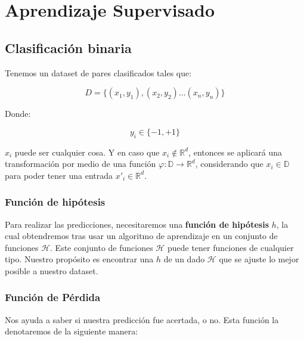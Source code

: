 \section{Aprendizaje Supervisado}

\subsection{Clasificación binaria}

Tenemos un dataset de pares clasificados tales que:

\[
    D = \{(x_1, y_1), (x_2, y_2) \dots (x_n, y_n)\}
\]

Donde:

\[
    y_i \in \{-1, +1\}
\]

$x_i$ puede ser cualquier cosa. 
Y en caso que $x_i \notin \mathbb{R} ^ d$, entonces se aplicará una transformación por medio de una función $\varphi : \mathbb{D} \to \mathbb{R} ^ d$, considerando que $x_i \in \mathbb{D}$ para poder tener una entrada $x'_i \in \mathbb{R}^d$.

\subsubsection{Función de hipótesis}

Para realizar las predicciones, necesitaremos una \textbf{función de hipótesis} $h$, la cual obtendremos tras usar un algoritmo de aprendizaje en un conjunto de funciones $\mathcal{H}$.
Este conjunto de funciones $\mathcal{H}$ puede tener funciones de cualquier tipo.
Nuestro propósito es encontrar una $h$ de un dado $\mathcal{H}$ que se ajuste lo mejor posible a nuestro dataset.


\subsubsection{Función de Pérdida}

Nos ayuda a saber si nuestra predicción fue acertada, o no. 
Esta función la denotaremos de la siguiente manera:


